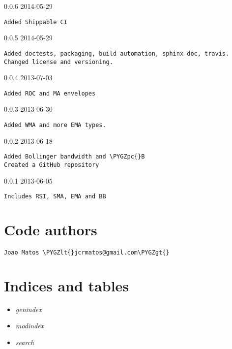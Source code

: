 \documentclass[letterpaper,10pt,english]{sphinxmanual}
\def\PYGZlt{\char`\<}
\def\PYGZgt{\char`\>}
\def\PYGZpc{\char`\%}
\begin{document}
0.0.6 2014-05-29

\begin{Verbatim}[commandchars=\\\{\}]
Added Shippable CI
\end{Verbatim}

0.0.5 2014-05-29

\begin{Verbatim}[commandchars=\\\{\}]
Added doctests, packaging, build automation, sphinx doc, travis.
Changed license and versioning.
\end{Verbatim}

0.0.4 2013-07-03

\begin{Verbatim}[commandchars=\\\{\}]
Added ROC and MA envelopes
\end{Verbatim}

0.0.3 2013-06-30

\begin{Verbatim}[commandchars=\\\{\}]
Added WMA and more EMA types.
\end{Verbatim}

0.0.2 2013-06-18

\begin{Verbatim}[commandchars=\\\{\}]
Added Bollinger bandwidth and \PYGZpc{}B
Created a GitHub repository
\end{Verbatim}

0.0.1 2013-06-05

\begin{Verbatim}[commandchars=\\\{\}]
Includes RSI, SMA, EMA and BB
\end{Verbatim}


\chapter{Code authors}
\label{codeauthors:code-authors}\label{codeauthors::doc}
\begin{Verbatim}[commandchars=\\\{\}]
Joao Matos \PYGZlt{}jcrmatos@gmail.com\PYGZgt{}
\end{Verbatim}


\chapter{Indices and tables}
\label{index:indices-and-tables}\begin{itemize}
\item {} 
\emph{genindex}

\item {} 
\emph{modindex}

\item {} 
\emph{search}

\end{itemize}
\end{document}
